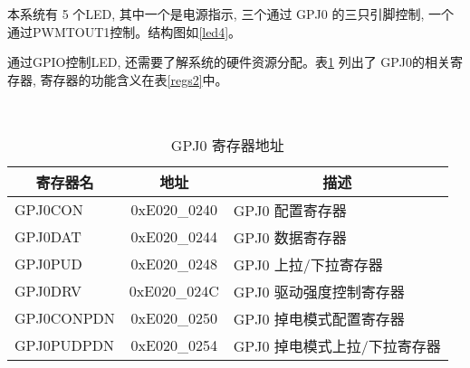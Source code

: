 	本系统有 5 个LED, 其中一个是电源指示, 三个通过 GPJ0 的三只引脚控制,
一个通过PWMTOUT1控制。结构图如\ref{led4}。

	通过GPIO控制LED, 还需要了解系统的硬件资源分配。表{}\ref{regs1} 列出了
GPJ0的相关寄存器, 寄存器的功能含义在表{}\ref{regs2}中。
	
\begin{table}[!h]
\centering
\caption{GPJ0 寄存器地址}\label{regs1} \ \\

\begin{tabular}{|l|c|l|}
\hline
\multicolumn{1}{|c|}{寄存器名} & 地址 & 
\multicolumn{1}{c|}{描述} \\\hline
	GPJ0CON   & 0xE020\_0240 & GPJ0 配置寄存器              \\\hline
	GPJ0DAT   & 0xE020\_0244 & GPJ0 数据寄存器              \\\hline
	GPJ0PUD   & 0xE020\_0248 & GPJ0 上拉/下拉寄存器         \\\hline
	GPJ0DRV   & 0xE020\_024C & GPJ0 驱动强度控制寄存器      \\\hline
	GPJ0CONPDN& 0xE020\_0250 & GPJ0 掉电模式配置寄存器      \\\hline
	GPJ0PUDPDN& 0xE020\_0254 & GPJ0 掉电模式上拉/下拉寄存器 \\\hline
\end{tabular}
\end{table}


